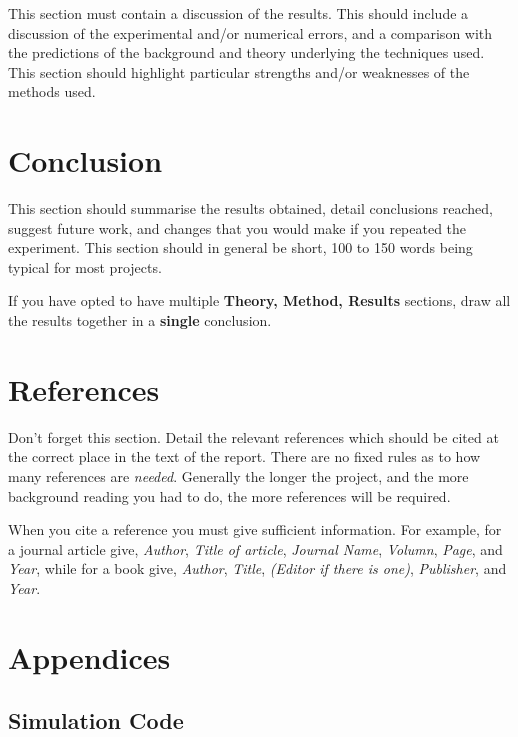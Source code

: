 \documentclass[a4paper,12pt]{article}
\begin{document}
This section must contain a discussion of the results. This should
include a discussion of the experimental and/or numerical errors, and a
comparison with the predictions of the background and theory underlying
the techniques used. This section should highlight particular strengths
and/or weaknesses of the methods used.

 
\section{Conclusion}
This section should summarise the results obtained, detail
conclusions reached, suggest future work, and changes that you would make if you repeated the
experiment. This section should in general be short, 100 to 150 words
being typical for most projects.
\par\noindent
If you have opted to have multiple {\bf Theory, Method, Results}
sections, draw all the results together in a {\bf single} conclusion.
\section{References}

Don't forget this section. Detail the relevant references which
should be cited at the correct place in the text of the report. There
are no fixed rules as to how many references are {\it needed}. Generally
the longer the project, and the more background reading you had to do,
the more references will be required. 

When you cite a reference you must give sufficient information. For
example, for a journal article give, {\it Author}, {\it Title of
article},
{\it Journal Name}, {\it Volumn}, {\it Page}, and {\it Year}, 
while for a book give, {\it Author}, {\it Title},
{\it (Editor if there is one)}, {\it Publisher}, and {\it Year}.        

   



\appendix
\section{Appendices}

%

\subsection{Simulation Code}
\end{document}

